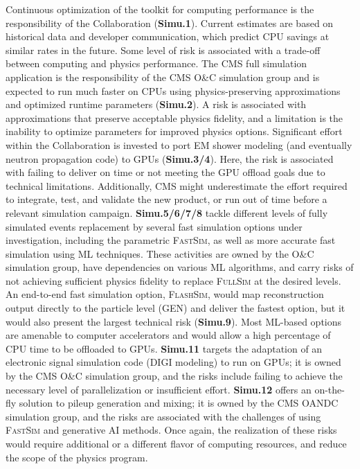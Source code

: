 Continuous optimization of the \GEANTfour toolkit for computing performance is the responsibility of the \GEANTfour Collaboration (\textbf{Simu.1}). Current estimates are based on historical data and developer communication, which predict \gls{CPU} savings at similar rates in the future. Some level of risk is associated with a trade-off between computing and physics performance. The CMS full simulation application is the responsibility of the CMS O\&C simulation group and is expected to run much faster on \glspl{CPU} using physics-preserving approximations and optimized runtime parameters (\textbf{Simu.2}). A risk is associated with approximations that preserve acceptable physics fidelity, and a limitation is the inability to optimize parameters for improved physics options. Significant effort within the \GEANTfour Collaboration is invested to port \gls{EM} shower modeling (and eventually neutron propagation code) to \glspl{GPU} (\textbf{Simu.3/4}). Here, the risk is associated with \GEANTfour failing to deliver on time or not meeting the \gls{GPU} offload goals due to technical limitations. Additionally, CMS might underestimate the effort required to integrate, test, and validate the new product, or run out of time before a relevant simulation campaign. \textbf{Simu.5/6/7/8} tackle different levels of fully simulated events replacement by several fast simulation options under investigation, including the parametric \textsc{FastSim}, as well as more accurate fast simulation using \gls{ML} techniques. These activities are owned by the O\&C simulation group, have dependencies on various \gls{ML} algorithms, and carry risks of not achieving sufficient physics fidelity to replace \textsc{FullSim} at the desired levels. An end-to-end fast simulation option, \textsc{FlashSim}, would map reconstruction output directly to the particle level (\gls{GEN}) and deliver the fastest option, but it would also present the largest technical risk (\textbf{Simu.9}). Most \gls{ML}-based options are amenable to computer accelerators and would allow a high percentage of \gls{CPU} time to be offloaded to \glspl{GPU}.  \textbf{Simu.11} targets the adaptation of an electronic signal simulation code (\gls{DIGI} modeling) to run on \glspl{GPU}; it is owned by the CMS O\&C simulation group, and the risks include failing to achieve the necessary level of parallelization or insufficient effort.
\textbf{Simu.12} offers an on-the-fly solution to pileup generation and mixing; it is owned by the CMS \gls{OANDC} simulation group, and the risks are associated with the challenges of using \textsc{FastSim} and generative \gls{AI} methods. Once again, the realization of these risks would require additional or a different flavor of computing resources, and reduce the scope of the physics program.

